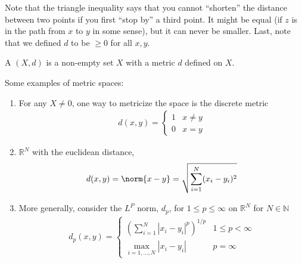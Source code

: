 \documentclass{article}
\begin{document}
Note that the triangle inequality says that you cannot ``shorten'' the distance between two points if you first ``stop by'' a third point. It might be equal (if $z$ is in the path from $x$ to $y$ in some sense), but it can never be smaller. Last, note that we defined $d$ to be $\ge 0$ for all $x, y$.

\begin{definition}\label{def:lecture1_space}
  A  $(X, d)$ is a non-empty set $X$ with a metric $d$ defined on $X$.
\end{definition}

Some examples of metric spaces:
\begin{enumerate}
  \item For any $X \ne 0$, one way to metricize the space is the discrete metric
    \begin{align*}
      d(x, y) = \begin{cases}
        1 & x \ne y \\
        0 & x = y
      \end{cases}
    \end{align*}

  \item $\mathbb{R}^N$ with the euclidean distance,
    \begin{align*}
      d(x, y)
      = \norm{x - y}
      = \sqrt{\sum^{N}_{i = 1} (x_i - y_i)^2}
    \end{align*}

  \item More generally, consider the $L^P$ norm, $d_p$, for $1 \le p \le \infty$ on $\mathbb{R}^N$ for $N \in \mathbb{N}$
    \begin{align*}
      d_p(x, y)
      =
      \begin{cases}
        \left(\displaystyle\sum^{N}_{i = 1} |x_i - y_i|^p\right)^{1 / p}
          & 1 \le p < \infty \\[12pt]
        \displaystyle\max_{i = 1, \ldots, N} |x_i - y_i|
          & p = \infty
      \end{cases}
    \end{align*}


\end{enumerate}
\end{document}
